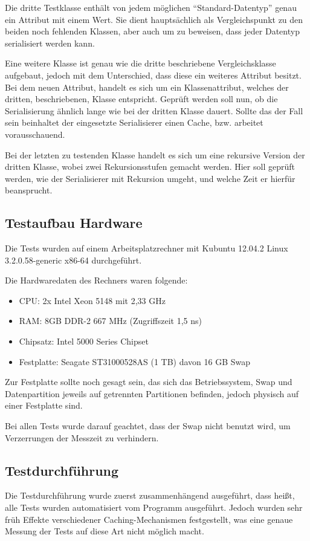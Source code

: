 Die dritte Testklasse enth\"alt von jedem m\"oglichen "`Standard-Datentyp"' genau ein Attribut mit einem Wert. Sie dient haupts\"achlich als Vergleichspunkt zu den beiden noch fehlenden Klassen, aber auch um zu beweisen, dass jeder Datentyp serialisiert werden kann.

Eine weitere Klasse ist genau wie die dritte beschriebene Vergleichsklasse aufgebaut, jedoch mit dem Unterschied, dass diese ein weiteres Attribut besitzt. Bei dem neuen Attribut, handelt es sich um ein Klassenattribut, welches der dritten, beschriebenen, Klasse entspricht.
Gepr\"uft werden soll nun, ob die Serialisierung \"ahnlich lange wie bei der dritten Klasse dauert. Sollte das der Fall sein beinhaltet der eingesetzte Serialisierer einen Cache, bzw. arbeitet vorausschauend.

Bei der letzten zu testenden Klasse handelt es sich um eine rekursive Version der dritten Klasse, wobei zwei Rekursionsstufen gemacht werden. Hier soll gepr\"uft werden, wie der Serialisierer mit Rekursion umgeht, und welche Zeit er hierf\"ur beansprucht.

\newpage
\subsection{Testaufbau Hardware}
Die Tests wurden auf einem Arbeitsplatzrechner mit Kubuntu 12.04.2 Linux 3.2.0.58-generic x86-64 durchgef\"uhrt.

Die Hardwaredaten des Rechners waren folgende:
\begin{itemize}
 \item CPU: 2x Intel Xeon 5148 mit 2,33 GHz
 \item RAM: 8GB DDR-2 667 MHz (Zugriffszeit 1,5 ns)
 \item Chipsatz: Intel 5000 Series Chipset
 \item Festplatte: Seagate ST31000528AS (1 TB) davon 16 GB Swap
\end{itemize}
Zur Festplatte sollte noch gesagt sein, das sich das Betriebssystem, Swap und Datenpartition jeweils auf getrennten Partitionen befinden, jedoch physisch auf einer Festplatte sind.

Bei allen Tests wurde darauf geachtet, dass der Swap nicht benutzt wird, um Verzerrungen der Messzeit zu verhindern.

\subsection{Testdurchf\"uhrung}
Die Testdurchf\"uhrung wurde zuerst zusammenh\"angend ausgef\"uhrt, dass hei\ss{}t, alle Tests wurden automatisiert vom Programm ausgef\"uhrt. Jedoch wurden sehr fr\"uh Effekte verschiedener Caching-Mechanismen festgestellt, was eine genaue Messung der Tests auf diese Art nicht m\"oglich macht. 

